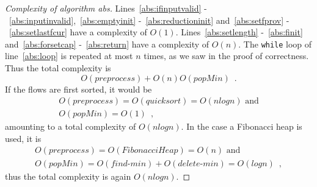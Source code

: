 \begin{proof}[Complexity of algorithm abs]
  Lines~\ref{abs:ifinputvalid} -~\ref{abs:inputinvalid},~\ref{abs:emptyinit} -~\ref{abs:reductioninit} and~\ref{abs:setfprov}
  -~\ref{abs:setlastfcur} have a complexity of $O(1)$. Lines~\ref{abs:setlength} -~\ref{abs:finit} and~\ref{abs:forsetcap}
  -~\ref{abs:return} have a complexity of $O(n)$. The \texttt{while} loop of line~\ref{abs:loop} is repeated at most $n$
  times, as we saw in the proof of correctness. Thus the total complexity is
  \begin{equation*}
    O(preprocess) + O(n)O(popMin) \enspace.
  \end{equation*}
  If the flows are first sorted, it would be
  \begin{equation*}
  \begin{gathered}
    O(preprocess) = O(quicksort) = O(nlogn) \mbox{ and} \\
    O(popMin) = O(1) \enspace,
  \end{gathered}
  \end{equation*}
  amounting to a total complexity of $O(nlogn)$. In the case a Fibonacci heap is used, it is
  \begin{equation*}
  \begin{gathered}
    O(preprocess) = O(FibonacciHeap) = O(n) \mbox{ and} \\
    O(popMin) = O(find\mbox{-}min) + O(delete\mbox{-}min) = O(logn) \enspace,
  \end{gathered}
  \end{equation*}
  thus the total complexity is again $O(nlogn)$.
\end{proof}
